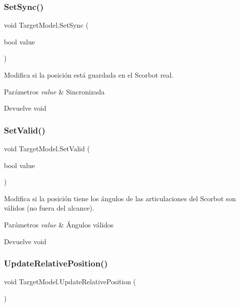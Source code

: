 \subsubsection{\texorpdfstring{SetSync()}{SetSync()}}
{\footnotesize\ttfamily void Target\+Model.\+Set\+Sync (\begin{DoxyParamCaption}\item[{bool}]{value }\end{DoxyParamCaption})\hspace{0.3cm}{\ttfamily [inline]}}

Modifica si la posición está guardada en el Scorbot real. 
\begin{DoxyParams}{Parámetros}
{\em value} & Sincronizada \\
\hline
\end{DoxyParams}
\begin{DoxyReturn}{Devuelve}
void 
\end{DoxyReturn}
\mbox{\label{class_target_model_a2e4a1b3d4b27c14c3d2c7657af636b0f}} 
\subsubsection{\texorpdfstring{SetValid()}{SetValid()}}
{\footnotesize\ttfamily void Target\+Model.\+Set\+Valid (\begin{DoxyParamCaption}\item[{bool}]{value }\end{DoxyParamCaption})\hspace{0.3cm}{\ttfamily [inline]}}

Modifica si la posición tiene los ángulos de las articulaciones del Scorbot son válidos (no fuera del alcance). 
\begin{DoxyParams}{Parámetros}
{\em value} & Ángulos válidos \\
\hline
\end{DoxyParams}
\begin{DoxyReturn}{Devuelve}
void 
\end{DoxyReturn}
\mbox{\label{class_target_model_a41b6989fae346f10e3d58ccd0587fc83}} 
\subsubsection{\texorpdfstring{UpdateRelativePosition()}{UpdateRelativePosition()}}
{\footnotesize\ttfamily void Target\+Model.\+Update\+Relative\+Position (\begin{DoxyParamCaption}{ }\end{DoxyParamCaption})\hspace{0.3cm}{\ttfamily [inline]}}


